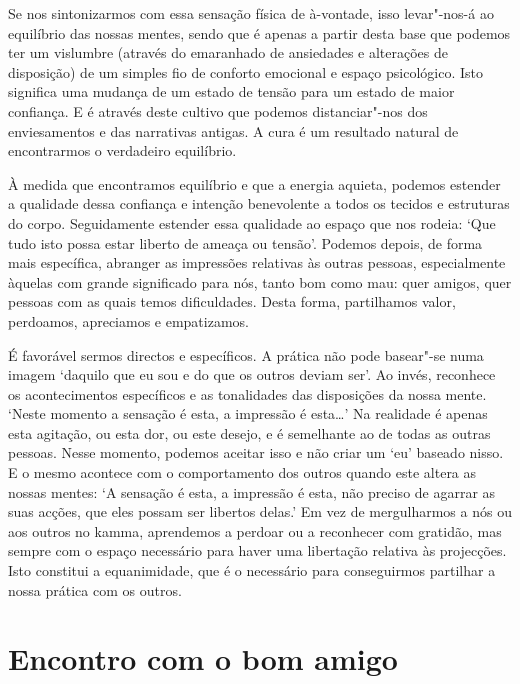 Se nos sintonizarmos com essa sensação física de à-vontade, isso levar"-nos-á ao
equilíbrio das nossas mentes, sendo que é apenas a partir desta base que podemos
ter um vislumbre (através do emaranhado de ansiedades e alterações de
disposição) de um simples fio de conforto emocional e espaço psicológico. Isto
significa uma mudança de um estado de tensão para um estado de maior confiança.
E é através deste cultivo que podemos distanciar"-nos dos enviesamentos e das
narrativas antigas. A cura é um resultado natural de encontrarmos o verdadeiro
equilíbrio.

À medida que encontramos equilíbrio e que a energia aquieta, podemos estender a
qualidade dessa confiança e intenção benevolente a todos os tecidos e estruturas
do corpo. Seguidamente estender essa qualidade ao espaço que nos rodeia: `Que
tudo isto possa estar liberto de ameaça ou tensão'. Podemos depois, de forma
mais específica, abranger as impressões relativas às outras pessoas,
especialmente àquelas com grande significado para nós, tanto bom como mau: quer
amigos, quer pessoas com as quais temos dificuldades. Desta forma, partilhamos
valor, perdoamos, apreciamos e empatizamos.

É favorável sermos directos e específicos. A prática não pode basear"-se numa
imagem `daquilo que eu sou e do que os outros deviam ser'. Ao invés, reconhece
os acontecimentos específicos e as tonalidades das disposições da nossa mente.
`Neste momento a sensação é esta, a impressão é esta\ldots{}' Na realidade é
apenas esta agitação, ou esta dor, ou este desejo, e é semelhante ao de todas as
outras pessoas. Nesse momento, podemos aceitar isso e não criar um `eu' baseado
nisso. E o mesmo acontece com o comportamento dos outros quando este altera as
nossas mentes: `A sensação é esta, a impressão é esta, não preciso de agarrar as
suas acções, que eles possam ser libertos delas.' Em vez de mergulharmos a nós
ou aos outros no kamma, aprendemos a perdoar ou a reconhecer com gratidão, mas
sempre com o espaço necessário para haver uma libertação relativa às projecções.
Isto constitui a equanimidade, que é o necessário para conseguirmos partilhar a
nossa prática com os outros.

\section{Encontro com o bom amigo}

